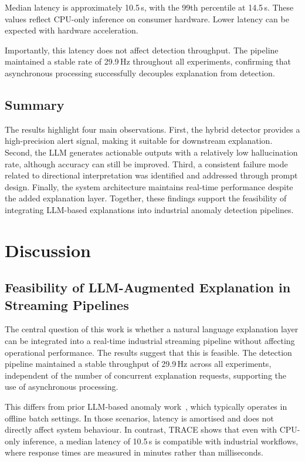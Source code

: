 \documentclass[11pt, a4paper]{article}
\begin{document}
Median latency is approximately 10.5\,s, with the 99th percentile at
14.5\,s. These values reflect CPU-only inference on consumer hardware.
Lower latency can be expected with hardware acceleration.

Importantly, this latency does not affect detection throughput. The
pipeline maintained a stable rate of 29.9\,Hz throughout all
experiments, confirming that asynchronous processing successfully
decouples explanation from detection.

\subsection{Summary}

The results highlight four main observations. First, the hybrid detector
provides a high-precision alert signal, making it suitable for
downstream explanation. Second, the LLM generates actionable outputs
with a relatively low hallucination rate, although accuracy can still be
improved. Third, a consistent failure mode related to directional
interpretation was identified and addressed through prompt design.
Finally, the system architecture maintains real-time performance despite
the added explanation layer. Together, these findings support the
feasibility of integrating LLM-based explanations into industrial
anomaly detection pipelines.

\section{Discussion}

\subsection{Feasibility of LLM-Augmented Explanation in Streaming Pipelines}

The central question of this work is whether a natural language 
explanation layer can be integrated into a real-time industrial streaming 
pipeline without affecting operational performance. The results suggest 
that this is feasible. The detection pipeline maintained a stable 
throughput of 29.9\,Hz across all experiments, independent of the number 
of concurrent explanation requests, supporting the use of asynchronous 
processing.

This differs from prior LLM-based anomaly work~\cite{alnegheimish2023sigllm, 
jiang2023anomalyllm}, which typically operates in offline batch settings. 
In those scenarios, latency is amortised and does not directly affect 
system behaviour. In contrast, TRACE shows that even with CPU-only 
inference, a median latency of 10.5\,s is compatible with industrial 
workflows, where response times are measured in minutes rather than 
milliseconds.
\end{document}

